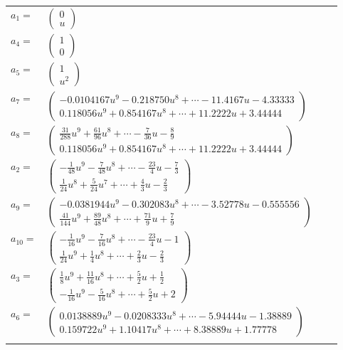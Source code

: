 \documentclass[1p]{elsarticle_modified}
\theoremstyle{definition}
\begin{document}
\begin{tabular}{m{7pt} m{180pt} m{7pt} m{180pt} }
\flushright $a_{1}=$&$\begin{pmatrix}0\\u\end{pmatrix}$ \\
\flushright $a_{4}=$&$\begin{pmatrix}1\\0\end{pmatrix}$ \\
\flushright $a_{5}=$&$\begin{pmatrix}1\\u^2\end{pmatrix}$ \\
\flushright $a_{7}=$&$\begin{pmatrix}-0.0104167 u^{9}-0.218750 u^{8}+\cdots-11.4167 u-4.33333\\0.118056 u^{9}+0.854167 u^{8}+\cdots+11.2222 u+3.44444\end{pmatrix}$ \\
\flushright $a_{8}=$&$\begin{pmatrix}\frac{31}{288} u^9+\frac{61}{96} u^8+\cdots-\frac{7}{36} u-\frac{8}{9}\\0.118056 u^{9}+0.854167 u^{8}+\cdots+11.2222 u+3.44444\end{pmatrix}$ \\
\flushright $a_{2}=$&$\begin{pmatrix}-\frac{1}{48} u^9-\frac{7}{48} u^8+\cdots-\frac{23}{4} u-\frac{7}{3}\\\frac{1}{24} u^8+\frac{5}{24} u^7+\cdots+\frac{4}{3} u-\frac{2}{3}\end{pmatrix}$ \\
\flushright $a_{9}=$&$\begin{pmatrix}-0.0381944 u^{9}-0.302083 u^{8}+\cdots-3.52778 u-0.555556\\\frac{41}{144} u^9+\frac{89}{48} u^8+\cdots+\frac{71}{9} u+\frac{7}{9}\end{pmatrix}$ \\
\flushright $a_{10}=$&$\begin{pmatrix}-\frac{1}{16} u^9-\frac{7}{16} u^8+\cdots-\frac{23}{4} u-1\\\frac{1}{24} u^9+\frac{1}{4} u^8+\cdots+\frac{2}{3} u-\frac{2}{3}\end{pmatrix}$ \\
\flushright $a_{3}=$&$\begin{pmatrix}\frac{1}{8} u^9+\frac{11}{16} u^8+\cdots+\frac{5}{2} u+\frac{1}{2}\\-\frac{1}{16} u^9-\frac{5}{16} u^8+\cdots+\frac{5}{2} u+2\end{pmatrix}$ \\
\flushright $a_{6}=$&$\begin{pmatrix}0.0138889 u^{9}-0.0208333 u^{8}+\cdots-5.94444 u-1.38889\\0.159722 u^{9}+1.10417 u^{8}+\cdots+8.38889 u+1.77778\end{pmatrix}$\\&\end{tabular}
\end{document}
